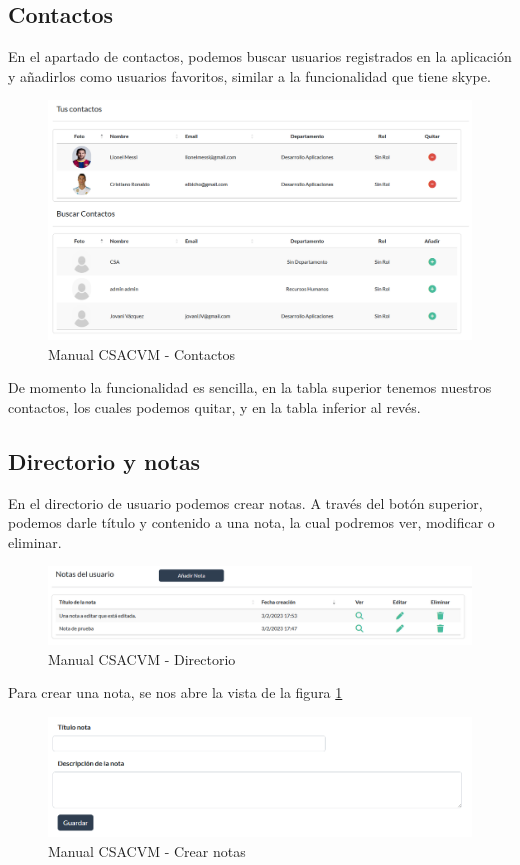 \subsection{Contactos}
En el apartado de contactos, podemos buscar usuarios registrados en la aplicación y añadirlos como usuarios favoritos, similar a la funcionalidad que tiene skype.
\begin{figure}
    \centering
    \includegraphics[width=\linewidth]{img/ManualUsuario/Manual05.png}
    \caption{Manual CSACVM - Contactos}
    
\end{figure}

De momento la funcionalidad es sencilla, en la tabla superior tenemos nuestros contactos, los cuales podemos quitar, y en la tabla inferior al revés.


\subsection{Directorio y notas}
En el directorio de usuario podemos crear notas. A través del botón superior, podemos darle título y contenido a una nota, la cual podremos ver, modificar o eliminar.
\begin{figure}
    \centering
    \includegraphics[width=\linewidth]{img/ManualUsuario/Manual06.png}
    \caption{Manual CSACVM - Directorio}  
\end{figure}

Para crear una nota, se nos abre la vista de la figura \ref{manualNotas}
\begin{figure}
    \centering
    \includegraphics[width=\linewidth]{img/ManualUsuario/Manual07.png}
    \caption{Manual CSACVM - Crear notas}
    \label{manualNotas}
\end{figure}

